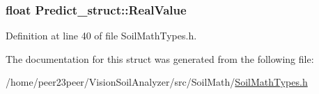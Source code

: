 \hypertarget{struct_predict__struct_a09932ff9ac15e4b182bf6e53232eba0f}{}
\subsubsection[{Real\+Value}]{\setlength{\rightskip}{0pt plus 5cm}float Predict\+\_\+struct\+::\+Real\+Value}\label{struct_predict__struct_a09932ff9ac15e4b182bf6e53232eba0f}


Definition at line 40 of file Soil\+Math\+Types.\+h.



The documentation for this struct was generated from the following file\+:\begin{DoxyCompactItemize}
\item 
/home/peer23peer/\+Vision\+Soil\+Analyzer/src/\+Soil\+Math/\hyperlink{_soil_math_types_8h}{Soil\+Math\+Types.\+h}\end{DoxyCompactItemize}
